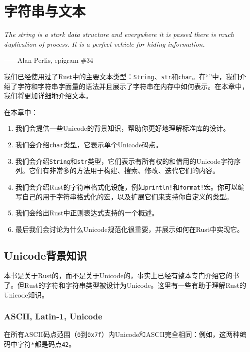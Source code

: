 \chapter{字符串与文本}\label{ch17}

\emph{The string is a stark data structure and everywhere it is passed there is much duplication of process. It is a perfect vehicle for hiding information.}
\begin{flushright}
    ——Alan Perlis, epigram \#34
\end{flushright}

我们已经使用过了Rust中的主要文本类型：\texttt{String}、\texttt{str}和\texttt{char}。在“”中，我们介绍了字符和字符串字面量的语法并且展示了字符串在内存中如何表示。在本章中，我们将更加详细地介绍文本。

在本章中：
\begin{enumerate}
    \item 我们会提供一些Unicode的背景知识，帮助你更好地理解标准库的设计。
    \item 我们会介绍\texttt{char}类型，它表示单个Unicode码点。
    \item 我们会介绍\texttt{String}和\texttt{str}类型，它们表示有所有权的和借用的Unicode字符序列。它们有非常多的方法用于构建、搜索、修改、迭代它们的内容。
    \item 我们会介绍Rust的字符串格式化设施，例如\texttt{println!}和\texttt{format!}宏。你可以编写自己的用于字符串格式化的宏，以及扩展它们来支持你自定义的类型。
    \item 我们会给出Rust中正则表达式支持的一个概述。
    \item 最后我们会讨论为什么Unicode规范化很重要，并展示如何在Rust中实现它。
\end{enumerate}

\section{Unicode背景知识}

本书是关于Rust的，而不是关于Unicode的，事实上已经有整本专门介绍它的书了。但Rust的字符和字符串类型被设计为Unicode。这里有一些有助于理解Rust的Unicode知识。

\subsection{ASCII, Latin-1, Unicode}
在所有ASCII码点范围（\texttt{0}到\texttt{0x7f}）内Unicode和ASCII完全相同：例如，这两种编码中字符\texttt{*}都是码点\texttt{42}。

